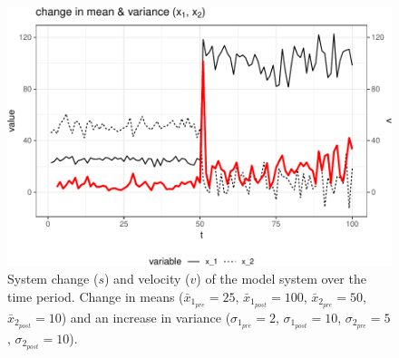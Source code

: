 \documentclass[12pt,twoside,openany]{reedthesis}
\begin{document}
\begin{figure}
\centering
\includegraphics{_myDissertation_files/figure-latex/velocSysEx2-1.pdf}
\caption{\label{fig:velocSysEx2}System change (\(s\)) and velocity (\(v\)) of the model system over the time period. Change in means (\(\bar{x}_{1_{pre}}=25\), \(\bar{x}_{1_{post}}=100\), \(\bar{x}_{2_{pre}}=50\), \(\bar{x}_{2_{post}}=10\)) and an increase in variance (\(\sigma_{1_{pre}}=2\), \(\sigma_{1_{post}}=10\), \(\sigma_{2_{pre}}=5\), \(\sigma_{2_{post}}=10\)).}
\end{figure}
\end{document}
